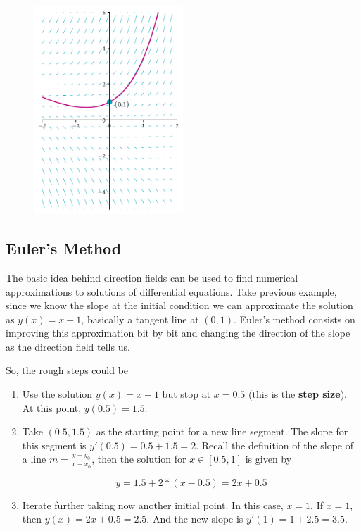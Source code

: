 \documentclass[a4paper,11pt]{article}
\theoremstyle{definition}
\theoremstyle{plain}
\begin{document}
	\begin{figure}[htbp]
	\centering 
		\includegraphics[width = 0.5\textwidth]{Ch3_files/Ch3_32_0.pdf}
		\caption{}
		\label{fig:direction_field}	
	\end{figure}
    
\subsection{Euler's Method}\label{eulers-method}

The basic idea behind direction fields can be used to find numerical approximations to solutions of differential equations. Take previous example, since we know the slope at the initial condition we can approximate the solution as \(y(x) = x + 1\), basically a tangent line at \((0, 1)\). Euler's method consists on improving this approximation
bit by bit and changing the direction of the slope as the direction field tells us.

So, the rough steps could be 

\begin{enumerate}
	\item Use the solution \(y(x) = x + 1\) but stop at \(x = 0.5\) (this is the \textbf{step size}). At this point, \(y(0.5) = 1.5\). 
	\item Take \((0.5, 1.5)\) as the starting point for a new line segment. The slope for this segment is \(y'(0.5) = 0.5 + 1.5 = 2\). Recall the definition of the slope of a line \(m = \frac{y - y_0}{x - x_0}\), then the solution for \(x\in[0.5,1]\) is given by 

	\[
	y = 1.5 + 2*(x-0.5) = 2x + 0.5
	\] 

	\item Iterate further taking now another initial point. In this case, \(x = 1\). If \(x = 1\), then \(y(x) = 2x +0.5 =2.5\). And the new slope is \(y'(1) = 1 + 2.5 = 3.5\).
\end{enumerate}
\end{document}
